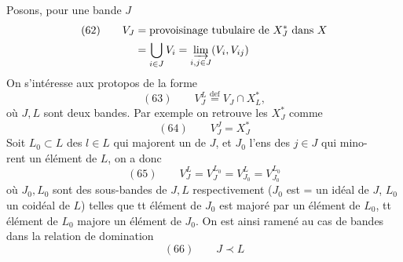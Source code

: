 

Posons, pour une bande $J$
\[
\begin{aligned}
(62)\qquad V_J&=\text{provoisinage tubulaire de }X_J^*\text{ dans }X\\
&=\bigcup_{i\in J}V_i=\varinjlim_{i,j\in J}(V_i,V_{ij})
\end{aligned}
\]
On s'intéresse aux protopos de la forme
\[
(63)\qquad V_J^L\overset{\mathrm{def}}{=}V_J\cap X_L^*,
\]
où $J,L$ sont deux bandes. Par exemple on retrouve les $X_J^*$ comme
\[
(64)\qquad V_J^J=X_J^*
\]
Soit $L_0\subset L$  des $l\in L$ qui majorent un  de $J$, et $J_0$ l'ens des $j\in J$ qui mino-\\rent un élément de $L$, on a donc
\[
(65)\qquad V_J^L=V_J^{L_0}=V_{J_0}^L=V_{J_0}^{L_0}
\]
où $J_0,L_0$ sont des sous-bandes de $J,L$ respectivement ($J_0$ est = un idéal de $J$, $L_0$ un coidéal de $L$) telles que tt élément de $J_0$ est majoré par un élément de $L_0$, tt élément de $L_0$ majore un élément de $J_0$. On est ainsi ramené au cas de bandes dans la relation de domination
\[
(66)\qquad J\prec L
\]
